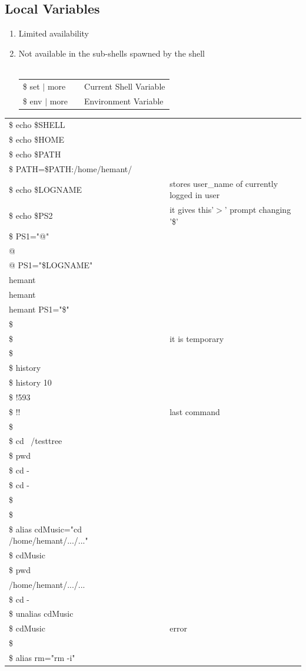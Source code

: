 \documentclass[12pt, a4paper]{report}
\begin{document}
\subsection{Local Variables}
\begin{enumerate}
\item Limited availability
\item Not available in the sub-shells spawned by the shell\\
\\
\begin{tabular}{|lcl|}\hline
\$ set $|$ more && Current Shell Variable \\
\$ env $|$ more  && Environment Variable\\ \hline
\end{tabular}
\end{enumerate}
\begin{tabular}{|lcl|}\hline
\$ echo \$SHELL&&\\
\$ echo \$HOME&&\\
\$ echo \$PATH&&\\
\$ PATH=\$PATH:/home/hemant/&&\\
\$ echo \$LOGNAME && stores user\_name of currently logged in user\\
\$ echo \$PS2 && it gives this'$>$' prompt changing '\$'\\
\$ PS1="@"&&\\
@&&\\
@ PS1="\$LOGNAME"&&\\
hemant&&\\
hemant&&\\
hemant PS1="\$"&&\\
\$&&\\
\$ && it is temporary\\
\$&&\\
\$ history&&\\
\$ history 10&&\\
\$ !593&&\\
\$ !! && last command\\
\$&&\\
\$ cd ~/testtree&&\\
\$ pwd&&\\
\$ cd -&&\\
\$ cd -&&\\
\$&&\\
\$&&\\
\$ alias cdMusic="cd /home/hemant/.../..."&&\\
\$ cdMusic&&\\
\$ pwd &&\\
/home/hemant/.../...&&\\
\$ cd -&&\\
\$ unalias cdMusic&&\\
\$ cdMusic && error\\
\$&&\\
\$ alias rm="rm -i"&&\\ \hline
\end{tabular}
%
\end{document}
